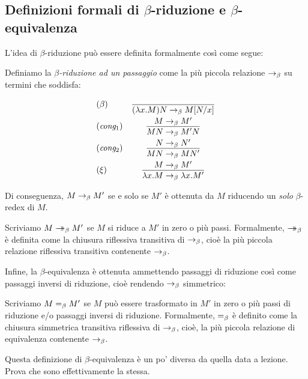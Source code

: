 \documentclass{article}
\begin{document}
\subsection{Definizioni formali di $\beta$-riduzione e $\beta$-equivalenza}

L'idea di $\beta$-riduzione pu\`o essere definita formalmente cos\`i come segue:

\begin{definition}\label{page-def-beta}
  Definiamo la {\em $\beta$-riduzione ad un passaggio} come la pi\`u piccola
  relazione $\rightarrow_{\beta}$ su termini che soddisfa:
  \[ \begin{array}{lc}
    \nrule{\beta} &
    \deriv{}{(\lam x.M)N\redb \subst{M}{N}{x}} \nl
    \trule{cong$_1$} &
    \deriv{M\redb M'}{MN\redb M'N} \nl
    \trule{cong$_2$} &
    \deriv{N\redb N'}{MN\redb MN'} \nl
    \nrule{\xi} &
    \deriv{M\redb M'}{\lam x.M\redb \lam x.M'}
  \end{array}
  \]
\end{definition}

Di conseguenza, $M\rightarrow_{\beta} M'$ se e solo se $M'$ \`e ottenuta da $M$ 
riducendo un {\em solo} $\beta$-redex di $M$.

\begin{definition}
  Scriviamo $M\mathrel{\rightarrow\!\!\!\!\!\rightarrow}_{\beta} M'$ se $M$ si riduce a $M'$ in zero o pi\`u passi.
  Formalmente, $\mathrel{\rightarrow\!\!\!\!\!\rightarrow}_{\beta}$ \`e definita come la chiusura riflessiva
transitiva di $\rightarrow_{\beta}$, cio\`e la pi\`u piccola relazione riflessiva
transitiva contenente $\rightarrow_{\beta}$.
\end{definition}
  
Infine, la $\beta$-equivalenza \`e ottenuta ammettendo passaggi di
riduzione cos\`i come passaggi inversi di riduzione, cio\`e rendendo $\rightarrow_{\beta}$
simmetrico:

\begin{definition}
  Scriviamo $M=_{\beta} M'$ se $M$ pu\`o essere trasformato in $M'$ in zero o pi\`u
  passi di riduzione e/o passaggi inversi di riduzione. Formalmente,
  $=_{\beta}$ \`e definito come la chiusura simmetrica transitiva riflessiva
  di $\rightarrow_{\beta}$, cio\`e, la pi\`u piccola relazione di equivalenza contenente
  $\rightarrow_{\beta}$.
\end{definition}

\begin{exercise}
  Questa definizione di $\beta$-equivalenza \`e un po' diversa da
  quella data a lezione. Prova che sono effettivamente la stessa.
\end{exercise}
\end{document}

